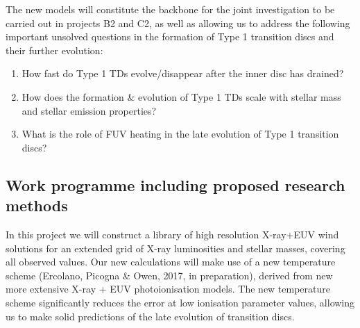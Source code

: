 \documentclass[10pt,fleqn,twoside]{article}
\newcommand{\Tcol}{\color{blue}}
\begin{document}
The new models will constitute the backbone for the joint
investigation to be carried out in projects B2 and C2, as well as
allowing us to address the following important unsolved questions in
the formation of Type 1 transition discs and their further evolution: 

\begin{enumerate}
\item How fast do Type 1 TDs evolve/disappear after the inner disc has
  drained?
\item How does the formation \& evolution of Type 1 TDs scale with
  stellar mass and stellar emission properties?
\item What is the role of FUV heating in the late evolution of Type 1
  transition discs? 
\end{enumerate}



\subsection{\Tcol Work programme including proposed research methods}
In this project we will construct a
library of high resolution X-ray+EUV wind solutions for an extended grid of
X-ray luminosities and stellar masses, covering all observed
values. Our new calculations will make use of a new temperature
scheme (Ercolano, Picogna \& Owen, 2017, in preparation), derived from
new more extensive X-ray + EUV photoionisation models.  The new
temperature scheme
significantly reduces the error at low ionisation parameter values,
allowing us to make solid predictions of the late evolution of
transition discs. 
\end{document}

